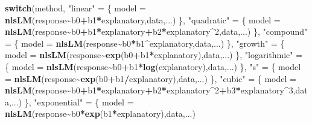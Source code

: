 \documentclass[
]{article}
\newenvironment{Shaded}{\begin{snugshade}}{\end{snugshade}}
\newcommand{\ControlFlowTok}[1]{\textcolor[rgb]{0.13,0.29,0.53}{\textbf{#1}}}
\newcommand{\DecValTok}[1]{\textcolor[rgb]{0.00,0.00,0.81}{#1}}
\newcommand{\FunctionTok}[1]{\textcolor[rgb]{0.13,0.29,0.53}{\textbf{#1}}}
\newcommand{\NormalTok}[1]{#1}
\newcommand{\OtherTok}[1]{\textcolor[rgb]{0.56,0.35,0.01}{#1}}
\newcommand{\SpecialCharTok}[1]{\textcolor[rgb]{0.81,0.36,0.00}{\textbf{#1}}}
\newcommand{\StringTok}[1]{\textcolor[rgb]{0.31,0.60,0.02}{#1}}
\begin{document}
\begin{Shaded}
\begin{Highlighting}[]
  \ControlFlowTok{switch}\NormalTok{(method,}
         \StringTok{"linear"} \OtherTok{=}\NormalTok{ \{}
\NormalTok{           model }\OtherTok{=} \FunctionTok{nlsLM}\NormalTok{(response}\SpecialCharTok{\textasciitilde{}}\NormalTok{b0}\SpecialCharTok{+}\NormalTok{b1}\SpecialCharTok{*}\NormalTok{explanatory,data,...)}
\NormalTok{         \},}
         \StringTok{"quadratic"} \OtherTok{=}\NormalTok{ \{}
\NormalTok{           model }\OtherTok{=} \FunctionTok{nlsLM}\NormalTok{(response}\SpecialCharTok{\textasciitilde{}}\NormalTok{b0}\SpecialCharTok{+}\NormalTok{b1}\SpecialCharTok{*}\NormalTok{explanatory}\SpecialCharTok{+}\NormalTok{b2}\SpecialCharTok{*}\NormalTok{explanatory}\SpecialCharTok{\^{}}\DecValTok{2}\NormalTok{,data,...)}
\NormalTok{         \},}
         \StringTok{"compound"} \OtherTok{=}\NormalTok{ \{}
\NormalTok{           model }\OtherTok{=} \FunctionTok{nlsLM}\NormalTok{(response}\SpecialCharTok{\textasciitilde{}}\NormalTok{b0}\SpecialCharTok{*}\NormalTok{b1}\SpecialCharTok{\^{}}\NormalTok{explanatory,data,...)}
\NormalTok{         \},}
         \StringTok{"growth"} \OtherTok{=}\NormalTok{ \{}
\NormalTok{           model }\OtherTok{=} \FunctionTok{nlsLM}\NormalTok{(response}\SpecialCharTok{\textasciitilde{}}\FunctionTok{exp}\NormalTok{(b0}\SpecialCharTok{+}\NormalTok{b1}\SpecialCharTok{*}\NormalTok{explanatory),data,...)}
\NormalTok{         \},}
         \StringTok{"logarithmic"} \OtherTok{=}\NormalTok{ \{}
\NormalTok{           model }\OtherTok{=} \FunctionTok{nlsLM}\NormalTok{(response}\SpecialCharTok{\textasciitilde{}}\NormalTok{b0}\SpecialCharTok{+}\NormalTok{b1}\SpecialCharTok{*}\FunctionTok{log}\NormalTok{(explanatory),data,...)}
\NormalTok{         \},}
         \StringTok{"s"} \OtherTok{=}\NormalTok{ \{}
\NormalTok{           model }\OtherTok{=} \FunctionTok{nlsLM}\NormalTok{(response}\SpecialCharTok{\textasciitilde{}}\FunctionTok{exp}\NormalTok{(b0}\SpecialCharTok{+}\NormalTok{b1}\SpecialCharTok{/}\NormalTok{explanatory),data,...)}
\NormalTok{         \},}
         \StringTok{"cubic"} \OtherTok{=}\NormalTok{ \{}
\NormalTok{           model }\OtherTok{=} \FunctionTok{nlsLM}\NormalTok{(response}\SpecialCharTok{\textasciitilde{}}\NormalTok{b0}\SpecialCharTok{+}\NormalTok{b1}\SpecialCharTok{*}\NormalTok{explanatory}\SpecialCharTok{+}\NormalTok{b2}\SpecialCharTok{*}\NormalTok{explanatory}\SpecialCharTok{\^{}}\DecValTok{2}\SpecialCharTok{+}\NormalTok{b3}\SpecialCharTok{*}\NormalTok{explanatory}\SpecialCharTok{\^{}}\DecValTok{3}\NormalTok{,data,...)}
\NormalTok{         \},}
         \StringTok{"exponential"} \OtherTok{=}\NormalTok{ \{}
\NormalTok{           model }\OtherTok{=} \FunctionTok{nlsLM}\NormalTok{(response}\SpecialCharTok{\textasciitilde{}}\NormalTok{b0}\SpecialCharTok{*}\FunctionTok{exp}\NormalTok{(b1}\SpecialCharTok{*}\NormalTok{explanatory),data,...)}

\end{Highlighting}
\end{Shaded}
\end{document}
